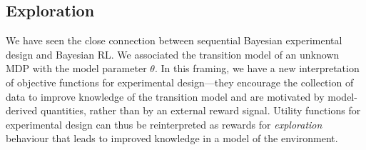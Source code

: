\documentclass[a4paper, 10pt]{report}
\theoremstyle{plain}
\newtheorem{proposition}[theorem]{Proposition}
\begin{document}
	
	
	
	
	\subsection{Exploration}
	\label{sec:exploration}
	We have seen the close connection between sequential Bayesian experimental design and Bayesian RL.
	We associated the transition model of an unknown MDP with the model parameter $\theta$.
	In this framing, we have a new interpretation of objective functions for experimental design---they encourage the collection of data to improve knowledge of the transition model and are motivated by model-derived quantities, rather than by an external reward signal.
	Utility functions for experimental design can thus be reinterpreted as rewards for \emph{exploration} behaviour that leads to improved knowledge in a model of the environment. 
	
\end{document}
